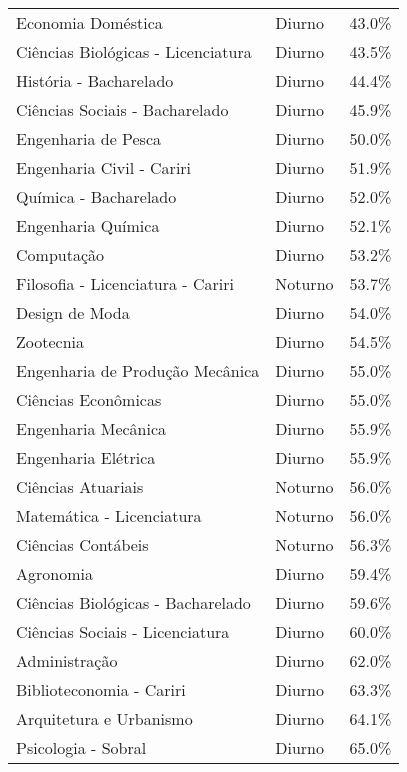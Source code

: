 \begin{tabular}{lll}
                 Economia Doméstica &   Diurno &   43.0\% \\
 Ciências Biológicas - Licenciatura &   Diurno &   43.5\% \\
             História - Bacharelado &   Diurno &   44.4\% \\
     Ciências Sociais - Bacharelado &   Diurno &   45.9\% \\
                Engenharia de Pesca &   Diurno &   50.0\% \\
          Engenharia Civil - Cariri &   Diurno &   51.9\% \\
              Química - Bacharelado &   Diurno &   52.0\% \\
                 Engenharia Química &   Diurno &   52.1\% \\
                         Computação &   Diurno &   53.2\% \\
  Filosofia - Licenciatura - Cariri &  Noturno &   53.7\% \\
                     Design de Moda &   Diurno &   54.0\% \\
                          Zootecnia &   Diurno &   54.5\% \\
    Engenharia de Produção Mecânica &   Diurno &   55.0\% \\
                Ciências Econômicas &   Diurno &   55.0\% \\
                Engenharia Mecânica &   Diurno &   55.9\% \\
                Engenharia Elétrica &   Diurno &   55.9\% \\
                 Ciências Atuariais &  Noturno &   56.0\% \\
          Matemática - Licenciatura &  Noturno &   56.0\% \\
                 Ciências Contábeis &  Noturno &   56.3\% \\
                          Agronomia &   Diurno &   59.4\% \\
  Ciências Biológicas - Bacharelado &   Diurno &   59.6\% \\
    Ciências Sociais - Licenciatura &   Diurno &   60.0\% \\
                      Administração &   Diurno &   62.0\% \\
           Biblioteconomia - Cariri &   Diurno &   63.3\% \\
            Arquitetura e Urbanismo &   Diurno &   64.1\% \\
                Psicologia - Sobral &   Diurno &   65.0\% \\

\end{tabular}
